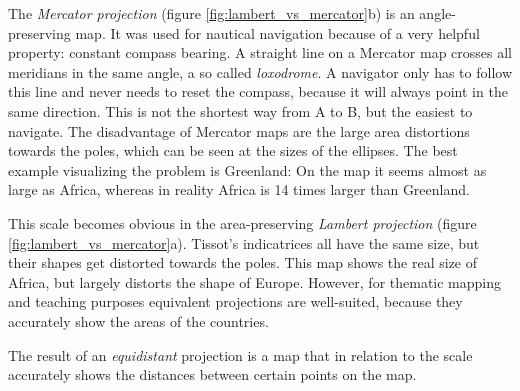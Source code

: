 \addtocounter{footnote}{1} %

The \emph{Mercator projection} (figure \ref{fig:lambert_vs_mercator}b) is an angle-preserving map. It was used for nautical navigation because of a very helpful property: constant compass bearing. A straight line on a Mercator map crosses all meridians in the same angle, a so called \emph{loxodrome}. A navigator only has to follow this line and never needs to reset the compass, because it will always point in the same direction. This is not the shortest way from A to B, but the easiest to navigate. The disadvantage of Mercator maps are the large area distortions towards the poles, which can be seen at the sizes of the ellipses. The best example visualizing the problem is Greenland: On the map it seems almost as large as Africa, whereas in reality Africa is 14 times larger than Greenland.
\cite{mapProjectionGeokov}

This scale becomes obvious in the area-preserving \emph{Lambert projection} (figure \ref{fig:lambert_vs_mercator}a). Tissot's indicatrices all have the same size, but their shapes get distorted towards the poles. This map shows the real size of Africa, but largely distorts the shape of Europe. However, for thematic mapping and teaching purposes equivalent projections are well-suited, because they accurately show the areas of the countries.
\cite{mapProjectionGeokov}

The result of an \emph{equidistant} projection is a map that in relation to the scale accurately shows the distances between certain points on the map.

